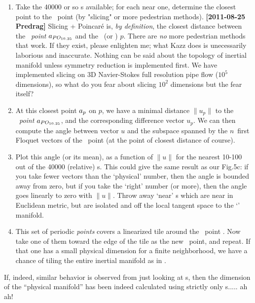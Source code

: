 \begin{description}
\begin{enumerate}
  \item Take the 40000 or so \po s available; for each near one,
    determine the closest point to the \template\ point  (by
    "slicing" or more pedestrian methods).
    {\bf [2011-08-25 Predrag]} Slicing + Poincar\'e is, \emph{by
      definition}, the closest distance between the \emph{\template{}int} $a_{PO_{10.25}}$ and the \po\ (or \rpo) $p$. There are
    \emph{no} more pedestrian methods that work. If they exist, please
    enlighten me; what Kazz does is unecessarily laborious and
    inaccurate. Nothing can be said about the topology of inertial
    manifold unless symmetry reduction is implemented first. We have
    implemented slicing on 3D Navier-Stokes full resolution pipe flow
    ($10^5$ dimensions), so what do you fear about slicing $10^2$
    dimensions but the fear itself?


  \item At this closest point $a_p$ on {\po} $p$, we have a minimal
    distance $\|u_p\|$ to the \emph{\template\ point} $a_{PO_{10.25}}$,
    and the corresponding difference vector $u_p$. We can then compute the
    angle between vector $u$ and the subspace spanned by the $n$~first
    Floquet vectors of the \template\ point  \PO{10.25} (at the point of
    closest distance of course).

  \item Plot this angle (or its mean), as a function of $\|u\|$ for the
    nearest 10-100 out of the 40000 (relative) \po s. This could give the
    same result as our Fig.5c: if you take fewer vectors than the
    `physical' number, then the angle is bounded away from zero, but if you
    take the `right' number (or more), then the angle goes linearly to zero
    with $\|u\|$. Throw away `near' \po s which are near in Euclidean
    metric, but are isolated and off the local tangent space to the
    `{\entangled}' manifold.

  \item This set of periodic \emph{points} covers a linearized tile
    around the \template\ point \PO{10.25}. Now take one of them toward the
    edge of the tile as the new \template\ point, and repeat. If that one
    has a small physical dimension for a finite neighborhood, we have a
    chance of tiling the entire inertial manifold as in
    .
  \end{enumerate}
  If, indeed, similar behavior is observed from just looking at \po s, then
  the dimension of the ``physical manifold'' has been indeed calculated
  using strictly only \po s.....  ah ah!


\end{description}
